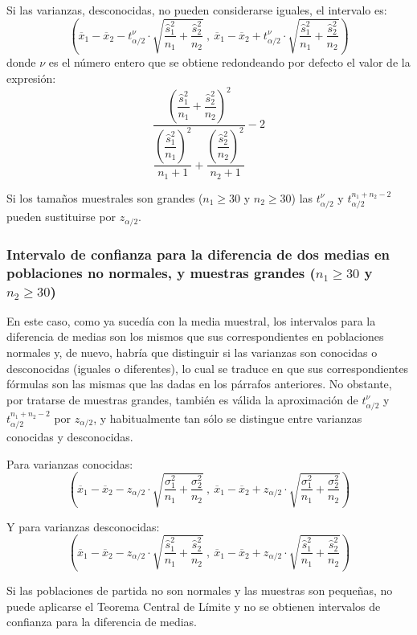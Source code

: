 Si las varianzas, desconocidas, no pueden considerarse iguales, el intervalo es:
\[
\left( \overline{x}_{1}-\overline{x}_{2}-t_{\alpha /2}^{\nu }\cdot \sqrt{
\dfrac{\hat s_{1}^{2}}{n_{1}}+\dfrac{\hat s_{2}^{2}}{n_{2}}}\ ,\
\overline{x}_{1}-\overline{x}_{2}+t_{\alpha /2}^{\nu }\cdot \sqrt{\dfrac{
\hat s_{1}^{2}}{n_{1}}+\dfrac{\hat s_{2}^{2}}{n_{2}}}\right)
\]
donde $\nu$ es el número entero que se obtiene redondeando por defecto el valor de la
expresión:
\[
\dfrac{\left( \dfrac{\hat s_{1}^{2}}{n_{1}}+\dfrac{\hat s_{2}^{2}}{
n_{2}}\right) ^{2}}{\dfrac{\left(
\dfrac{\hat s_{1}^{2}}{n_{1}}\right)^{2}}{n_{1}+1}+\dfrac{\left(\dfrac{\hat s_{2}^{2}}{n_{2}}\right) ^{2}}{n_{2}+1}}-2
\]

Si los tamaños muestrales son grandes ($n_{1}\geq30$ y $n_{2}\geq30$) las $t_{\alpha /2}^{\nu}$ y $t_{\alpha
/2}^{n_{1}+n_{2}-2}$ pueden sustituirse por $z_{\alpha/2}$.

\subsubsection {Intervalo de confianza para la diferencia de dos medias en poblaciones no normales, y muestras grandes
($n_{1}\geq30$ y $n_{2}\geq30$)} 
En este caso, como ya sucedía con la media muestral, los intervalos para la diferencia de medias son los mismos que sus
correspondientes en poblaciones normales y, de nuevo, habría que distinguir si las varianzas son conocidas o desconocidas
(iguales o diferentes), lo cual se traduce en que sus correspondientes fórmulas son las mismas que las dadas en los
párrafos anteriores. No obstante, por tratarse de muestras grandes, también es válida la aproximación de $t_{\alpha
/2}^{\nu}$ y $t_{\alpha /2}^{n_{1}+n_{2}-2}$ por $z_{\alpha/2}$, y habitualmente tan sólo se distingue entre varianzas
conocidas y desconocidas.

Para varianzas conocidas:
\[
\left( \overline{x}_{1}-\overline{x}_{2}-z_{\alpha /2}\cdot \sqrt{\dfrac{
\sigma _{1}^{2}}{n_{1}}+\dfrac{\sigma _{2}^{2}}{n_{2}}}\ ,\ \overline{x}_{1}-
\overline{x}_{2}+z_{\alpha /2}\cdot \sqrt{\dfrac{\sigma _{1}^{2}}{n_{1}}+
\dfrac{\sigma _{2}^{2}}{n_{2}}}\right)
\]

Y para varianzas desconocidas:
\[
\left( \overline{x}_{1}-\overline{x}_{2}-z_{\alpha /2}\cdot \sqrt{
\dfrac{\hat s_{1}^{2}}{n_{1}}+\dfrac{\hat s_{2}^{2}}{n_{2}}}\ ,\
\overline{x}_{1}-\overline{x}_{2}+z_{\alpha /2}\cdot \sqrt{\dfrac{
\hat s_{1}^{2}}{n_{1}}+\dfrac{\hat s_{2}^{2}}{n_{2}}}\right)
\]

Si las poblaciones de partida no son normales y las muestras son pequeñas, no puede aplicarse el Teorema Central de
Límite y no se obtienen intervalos de confianza para la diferencia de medias.

